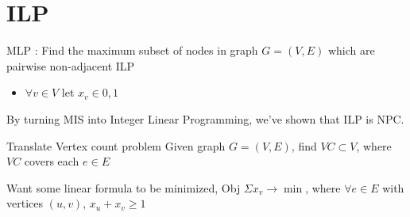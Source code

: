 \documentclass[10pt,letterpaper]{article}
\begin{document}
\section{ILP}
MLP :
Find the maximum subset of nodes in graph $G = (V,E)$ which are pairwise non-adjacent
ILP
\begin{itemize}
\item $\forall v \in V$ let $x_v \in {0,1}$  
\end{itemize}

By turning MIS into Integer Linear Programming, we've shown that ILP is NPC.

Translate Vertex count problem
Given graph $G = (V,E)$, find $VC \subset V$, where $VC$ covers each $e \in E$

Want some linear formula to be minimized, Obj $\Sigma x_v \rightarrow \min$, where $\forall e \in E$ with vertices $(u,v)$, $x_u + x_v \geq 1$
\end{document}

